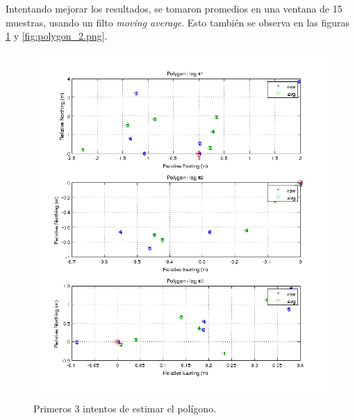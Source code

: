 \documentclass[spanish,12pt,a4paper,titlepage]{report}
\begin{document}
Intentando mejorar los resultados, se tomaron promedios en una ventana de 15 muestras, usando un filto \textit{moving average}. Esto también se observa en las figuras \ref{fig:polygon_1.png} y \ref{fig:polygon_2.png}.

\begin{figure}[h!]
  \begin{center}
  \includegraphics[width=1.1\textwidth]{./img/polygon_1.png}
  \end{center}
  \caption{Primeros 3 intentos de estimar el polígono.}
  \label{fig:polygon_1.png}
\end{figure}
\end{document}
